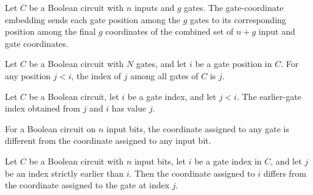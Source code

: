 \begin{definition}
\label{FABL.BooleanCircuit.gateCoordinate}
\leanok
{}
Let $C$ be a Boolean circuit with $n$ inputs and $g$ gates. The gate-coordinate
embedding sends each gate position among the $g$ gates to its corresponding position
among the final $g$ coordinates of the combined set of $n+g$ input and gate coordinates.
\end{definition}

\begin{definition}
\label{FABL.BooleanCircuit.previousGateIndex}
\leanok
{}
Let $C$ be a Boolean circuit with $N$ gates, and let $i$ be a gate position in $C$. For
any position $j<i$, the index of $j$ among all gates of $C$ is $j$.
\end{definition}

\begin{theorem}
\label{FABL.BooleanCircuit.previousGateIndex_val}
\leanok
{}
Let $C$ be a Boolean circuit, let $i$ be a gate index, and let $j<i$. The earlier-gate
index obtained from $j$ and $i$ has value $j$.
\end{theorem}

\begin{theorem}
\label{FABL.BooleanCircuit.gateCoordinate_ne_inputCoordinate}
\leanok
{}
For a Boolean circuit on $n$ input bits, the coordinate assigned to any gate is
different from the coordinate assigned to any input bit.
\end{theorem}

\begin{theorem}
\label{FABL.BooleanCircuit.gateCoordinate_ne_previousGateCoordinate}
\leanok
{}
Let $C$ be a Boolean circuit with $n$ input bits, let $i$ be a gate index in $C$, and
let $j$ be an index strictly earlier than $i$. Then the coordinate assigned to $i$
differs from the coordinate assigned to the gate at index $j$.
\end{theorem}

